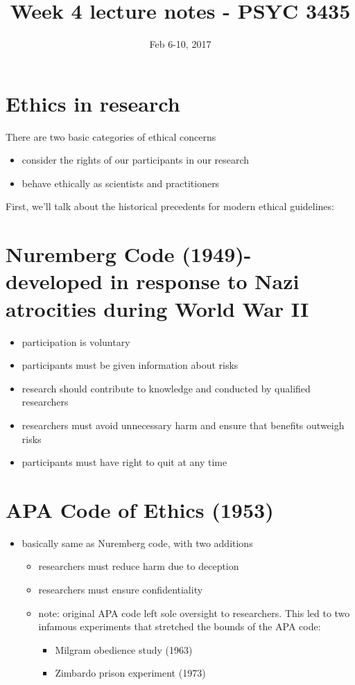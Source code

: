 \documentclass[11pt]{article}
\date{Feb 6-10, 2017}
\title{Week 4 lecture notes - PSYC 3435}
\begin{document}
\maketitle

\section*{Ethics in research}
\label{sec-1}
There are two basic categories of ethical concerns
\begin{itemize}
\item consider the rights of our participants in our research
\item behave ethically as scientists and practitioners
\end{itemize}

First, we'll talk about the historical precedents for modern ethical guidelines:
\section*{Nuremberg Code (1949)- developed in response to Nazi atrocities during World War II}
\label{sec-2}
\begin{itemize}
\item participation is voluntary
\item participants must be given information about risks
\item research should contribute to knowledge and conducted by qualified researchers
\item researchers must avoid unnecessary harm and ensure that benefits outweigh risks
\item participants must have right to quit at any time
\end{itemize}
\section*{APA Code of Ethics (1953)}
\label{sec-3}
\begin{itemize}
\item basically same as Nuremberg code, with two additions
\begin{itemize}
\item researchers must reduce harm due to deception
\item researchers must ensure confidentiality
\item note: original APA code left sole oversight to researchers. This led to two infamous experiments that stretched the bounds of the APA code:
\begin{itemize}
\item Milgram obedience study (1963)
\item Zimbardo prison experiment (1973)
\end{itemize}
\end{itemize}
\end{itemize}
\end{document}
